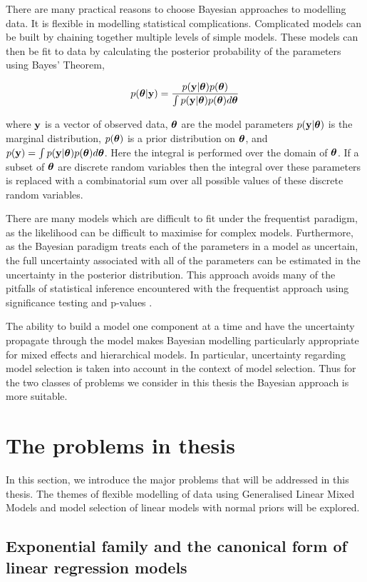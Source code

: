 There are many practical reasons to choose Bayesian approaches to modelling
data. It is flexible in modelling statistical complications. Complicated models
can be built by chaining together multiple levels of simple models. These models
can then be fit to data by calculating the posterior probability of the
parameters using Bayes' Theorem,

\[
	p({\boldsymbol \theta} | {\bf y}) = \frac{p({\bf y} | {\boldsymbol \theta}) p({\boldsymbol \theta})}{\int p({\bf y} | {\boldsymbol \theta}) p({\boldsymbol \theta}) d {\boldsymbol \theta}}
\]

where ${\bf y}$ is a vector of observed data, ${\boldsymbol \theta}$ are the model parameters
$p({\bf y}|{\boldsymbol \theta})$ is the marginal distribution, $p({\boldsymbol \theta})$ is a prior
distribution on ${\boldsymbol \theta}$, and $p({\bf y})=\int p({\bf y}|{\boldsymbol \theta})p({\boldsymbol \theta})d{\boldsymbol \theta}$.
Here the integral is performed over the domain of ${\boldsymbol \theta}$. If a subset of
${\boldsymbol \theta}$ are discrete random variables then the integral over these parameters
is replaced with a combinatorial sum over all possible values of these discrete
random variables.

There are many models which are difficult to fit under the frequentist paradigm,
as the likelihood can be difficult to maximise for complex models. Furthermore,
as the Bayesian paradigm treats each of the parameters in a model as uncertain,
the full uncertainty associated with all of the parameters can be estimated in
the uncertainty in the posterior distribution. This approach avoids many of the
pitfalls of statistical inference encountered with the frequentist approach
using significance testing and p-values \citep{Cox2005}.

The ability to build a model one component at a time and have the uncertainty
propagate through the model makes Bayesian modelling  particularly appropriate
for mixed effects and hierarchical models. In particular, uncertainty regarding
model selection is taken into account in the context of model selection. Thus
for the two classes of problems we consider in this thesis the Bayesian approach
is more suitable.

\section{The problems in thesis}

In this section, we introduce the major problems that will be addressed in this
thesis. The themes of flexible modelling of data using Generalised Linear Mixed
Models and model selection of linear models with normal priors  will be
explored.

\subsection{Exponential family and the canonical form of linear regression
models}

